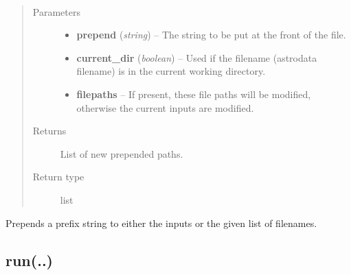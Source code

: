 \documentclass[letterpaper,10pt,english]{sphinxmanual}
\begin{document}
\begin{fulllineitems}
\label{chapter_ReductionContextClass:astrodata.RecipeManager.ReductionContext.prepend_names}~\begin{quote}\begin{description}
\item[{Parameters}] \leavevmode\begin{itemize}
\item {} 
\textbf{prepend} (\emph{string}) -- The string to be put at the front of the file.

\item {} 
\textbf{current\_dir} (\emph{boolean}) -- Used if the filename (astrodata filename) is in the
current working directory.

\item {} 
\textbf{filepaths} -- If present, these file paths will be modified, otherwise
the current inputs are modified.

\end{itemize}

\item[{Returns}] \leavevmode
List of new prepended paths.

\item[{Return type}] \leavevmode
list

\end{description}\end{quote}

Prepends a prefix string to either the inputs or the given list of filenames.

\end{fulllineitems}



\subsection{run(..)}
\label{chapter_ReductionContextClass:run}
\end{document}
